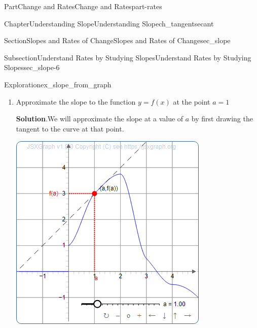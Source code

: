 \documentclass[oneside,10pt,]{tufte-book}
\newcommand{\blocktitlefont}{\relax}
\numberwithin{equation}{chapter}
\begin{document}
\begin{partptx}{Part}{Change and Rates}{}{Change and Rates}{}{}{part-rates}
\begin{chapterptx}{Chapter}{Understanding Slope}{}{Understanding Slope}{}{}{ch_tangentsecant}
\begin{sectionptx}{Section}{Slopes and Rates of Change}{}{Slopes and Rates of Change}{}{}{sec_slope}
\begin{subsectionptx}{Subsection}{Understand Rates by Studying Slopes}{}{Understand Rates by Studying Slopes}{}{}{sec_slope-6}
\begin{exploration}{Exploration}{}{ex_slope_from_graph}
\begin{image}{0.2}{0.6}{0.2}{}
{\begin{tikzpicture}
\end{tikzpicture}
}%
\end{image}%
\begin{enumerate}[font=\bfseries,label=(\alph*),ref=\alph*]%
\item{}Approximate the slope to the function \(y=f(x)\) at the point \(a=1\)%
\par\smallskip%
\noindent\textbf{\blocktitlefont Solution}.\hypertarget{ex_slope_from_graph-2-2}{}\quad{}We will approximate the slope at a value of \(a\) by first drawing the tangent to the curve at that point.%
\begin{sidebyside}{2}{0.075}{0.075}{0.17}%
\begin{sbspanel}{0.47}%
\includegraphics[width=\linewidth]{generated/preview/ex_slope_from_graph-2-2-2-preview.png}
\end{sbspanel}%
\begin{sbspanel}{0.21}%

\end{sbspanel}
\end{sidebyside}
\end{enumerate}
\end{exploration}
\end{subsectionptx}
\end{sectionptx}
\end{chapterptx}
\end{partptx}
\end{document}

